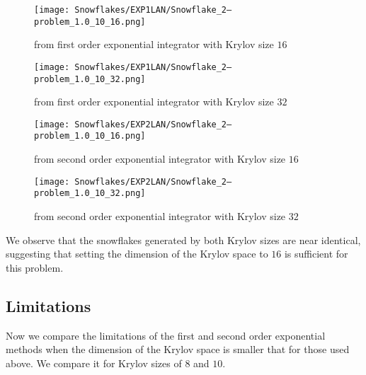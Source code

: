 \begin{figure}[H]
    \centering
    \begin{minipage}{0.49\textwidth}
        \texttt{[image: Snowflakes/EXP1LAN/Snowflake\_2--problem\_1.0\_10\_16.png]} %
        \caption{from first order exponential integrator with Krylov size $16$}
        \label{fig:first order 16}
    \end{minipage}\hfill
    \centering
    \begin{minipage}{0.49\textwidth}
        \texttt{[image: Snowflakes/EXP1LAN/Snowflake\_2--problem\_1.0\_10\_32.png]} %
        \caption{from first order exponential integrator with Krylov size $32$}
        \label{fig:first order 32}
    \end{minipage}\hfill
\end{figure}\begin{figure}[H]
    \centering
    \begin{minipage}{0.49\textwidth}
        \texttt{[image: Snowflakes/EXP2LAN/Snowflake\_2--problem\_1.0\_10\_16.png]} %
        \caption{from second order exponential integrator with Krylov size $16$}
        \label{fig:second order 16}
    \end{minipage}\hfill
    \centering
    \begin{minipage}{0.49\textwidth}
        \texttt{[image: Snowflakes/EXP2LAN/Snowflake\_2--problem\_1.0\_10\_32.png]} %
        \caption{from second order exponential integrator with Krylov size $32$}
        \label{fig:second order 32}
    \end{minipage}\hfill
\end{figure}

We observe that the snowflakes generated by both Krylov sizes are near identical, 
suggesting that setting the dimension of the Krylov space to $16$ is sufficient for this problem.\\

\subsection{Limitations}
Now we compare the limitations of the first and second order exponential methods when the dimension of the Krylov space is smaller that for those used above.
We compare it for Krylov sizes of $8$ and $10$.

